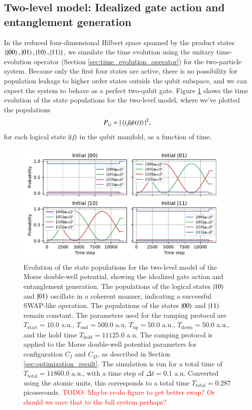 \documentclass{subfiles}
\begin{document}
\subsection{Two-level model: Idealized gate action and entanglement generation}
In the reduced four-dimensional Hilbert space spanned by the product states $\{\ket{00}, \ket{01}, \ket{10}, \ket{11}\}$, we simulate the time evolution using the unitary time-evolution operator (Section \ref{sec:time_evolution_operator}) for the two-particle system. Because only the first four states are active, there is no possibility for population leakage to higher order states outside the qubit subspace, and we can expect the system to behave as a perfect two-qubit gate. Figure \ref{fig:time_evolution_2_basefunctions} shows the time evolution of the state populations for the two-level model, where we've plotted the populations 
\begin{align*}
    P_{ij} = |\braket{ij| \psi(t)}|^2,
\end{align*}
for each logical state $\ket{ij}$ in the qubit manifold, as a function of time.
\begin{figure}[h!]
    \centering
    \includegraphics[width=1.0\textwidth]{figs/time_evolution_2_basefunctions_1806.pdf}
    \caption{Evolution of the state populations for the two-level model of the Morse double-well potential, showing the idealized gate action and entanglement generation. The populations of the logical states $\ket{10}$ and $\ket{01}$ oscillate in a coherent manner, indicating a successful SWAP-like operation. The populations of the states $\ket{00}$ and $\ket{11}$ remain constant. The parameters used for the ramping protocol are $T_{\text{start}} = 10.0$ a.u., $T_{\text{end}} = 500.0$ a.u, $T_{\text{up}} = 50.0$ a.u., $T_{\text{down}} = 50.0$ a.u., and the hold time $T_{\text{hold}} = 11125.0$ a.u. The ramping protocol is applied to the Morse double-well potential parameters for configuration $C_I$ and $C_{II}$, as described in Section \ref{sec:optimization_result}. The simulation is run for a total time of $T_{\text{total}} = 11860.0$ a.u., with a time step of $\Delta t = 0.1$ a.u. Converted using the atomic units, this corresponds to a total time $T_{\text{total}}=0.287$ picoseconds. \textcolor{red}{TODO: Maybe re-do figure to get better swap? Or should we save that to the full system perhaps?}}
    \label{fig:time_evolution_2_basefunctions}
\end{figure}
\\ 
\end{document}
